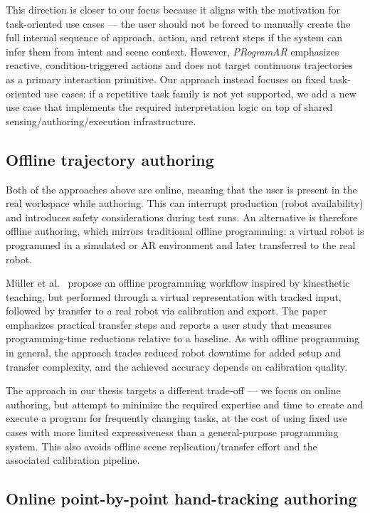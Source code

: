 This direction is closer to our focus because it aligns with the motivation for task-oriented use cases --- the user should not be forced to manually create the full internal sequence of approach, action, and retreat steps if the system can infer them from intent and scene context. However, \emph{PRogramAR} emphasizes reactive, condition-triggered actions and does not target continuous trajectories as a primary interaction primitive. Our approach instead focuses on fixed task-oriented use cases: if a repetitive task family is not yet supported, we add a new use case that implements the required interpretation logic on top of shared sensing/authoring/execution infrastructure.

\subsection{Offline trajectory authoring}

Both of the approaches above are online, meaning that the user is present in the real workspace while authoring. This can interrupt production (robot availability) and introduces safety considerations during test runs. An alternative is therefore offline authoring, which mirrors traditional offline programming: a virtual robot is programmed in a simulated or AR environment and later transferred to the real robot.

Müller et al.~\cite{Muller2024} propose an offline programming workflow inspired by kinesthetic teaching, but performed through a virtual representation with tracked input, followed by transfer to a real robot via calibration and export. The paper emphasizes practical transfer steps and reports a user study that measures programming-time reductions relative to a baseline. As with offline programming in general, the approach trades reduced robot downtime for added setup and transfer complexity, and the achieved accuracy depends on calibration quality.

The approach in our thesis targets a different trade-off --- we focus on online authoring, but attempt to minimize the required expertise and time to create and execute a program for frequently changing tasks, at the cost of using fixed use cases with more limited expressiveness than a general-purpose programming system. This also avoids offline scene replication/transfer effort and the associated calibration pipeline.

\subsection{Online point-by-point hand-tracking authoring}

